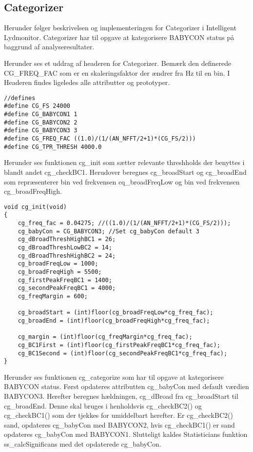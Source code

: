 \subsection{Categorizer}
Herunder følger beskrivelsen og implementeringen for Categorizer i Intelligent Lydmonitor.
Categorizer har til opgave at kategorisere BABYCON status på baggrund af analyseresultater. 


Herunder ses et uddrag af headeren for Categorizer. Bemærk den definerede CG\_FREQ\_FAC som er en skaleringsfaktor der ændrer fra Hz til en bin. I Headeren findes ligeledes alle attributter og prototyper.

\begin{verbatim}//defines
#define CG_FS 24000
#define CG_BABYCON1 1
#define CG_BABYCON2 2
#define CG_BABYCON3 3
#define CG_FREQ_FAC ((1.0)/(1/(AN_NFFT/2+1)*(CG_FS/2)))
#define CG_TPR_THRESH 4000.0
\end{verbatim}

Herunder ses funktionen cg\_init som sætter relevante threshholds der benyttes i blandt andet cg\_checkBC1. Herudover beregnes cg\_broadStart og cg\_broadEnd som repræsenterer bin ved frekvensen cq\_broadFreqLow og bin ved frekvensen cg\_broadFreqHigh. 

\begin{verbatim}void cg_init(void)
{
    cg_freq_fac = 0.04275; //((1.0)/(1/(AN_NFFT/2+1)*(CG_FS/2)));
    cg_babyCon = CG_BABYCON3; //Set cg_babyCon default 3
    cg_dBroadThreshHighBC1 = 26;
    cg_dBroadThreshLowBC2 = 14;
    cg_dBroadThreshHighBC2 = 24;
    cg_broadFreqLow = 1000;
    cg_broadFreqHigh = 5500;
    cg_firstPeakFreqBC1 = 1400;
    cg_secondPeakFreqBC1 = 4000;
    cg_freqMargin = 600;

    cg_broadStart = (int)floor(cg_broadFreqLow*cg_freq_fac);
    cg_broadEnd = (int)floor(cg_broadFreqHigh*cg_freq_fac);

    cg_margin = (int)floor(cg_freqMargin*cg_freq_fac);
    cg_BC1First = (int)floor(cg_firstPeakFreqBC1*cg_freq_fac);
    cg_BC1Second = (int)floor(cg_secondPeakFreqBC1*cg_freq_fac);
}
\end{verbatim}

Herunder ses funktionen cg\_categorize som har til opgave at kategorisere BABYCON status. 
Først opdateres attributten cg\_babyCon med default værdien BABYCON3. 
Herefter beregnes hældningen, cg\_dBroad fra cg\_broadStart til cg\_broadEnd. Denne skal bruges i henholdsvis cg\_checkBC2() og cg\_checkBC1() som der tjekkes for umiddelbart herefter. Er cg\_checkBC2() sand, opdateres cg\_babyCon med BABYCON2, hvis cg\_checkBC1() er sand opdateres cg\_babyCon med BABYCON1.
Slutteligt kaldes Statisticians funktion ss\_calcSignificans med det opdaterede cg\_babyCon.

